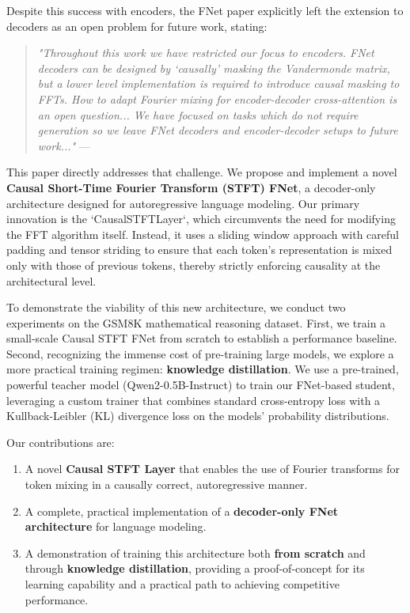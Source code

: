 \documentclass[11pt,a4paper]{article}
\begin{document}
Despite this success with encoders, the FNet paper explicitly left the extension to decoders as an open problem for future work, stating:

\begin{quote}
    \textit{"Throughout this work we have restricted our focus to encoders. FNet decoders can be designed by `causally' masking the Vandermonde matrix, but a lower level implementation is required to introduce causal masking to FFTs. How to adapt Fourier mixing for encoder-decoder cross-attention is an open question... We have focused on tasks which do not require generation so we leave FNet decoders and encoder-decoder setups to future work..."} --- \citet{lee2021fnet}
\end{quote}

This paper directly addresses that challenge. We propose and implement a novel \textbf{Causal Short-Time Fourier Transform (STFT) FNet}, a decoder-only architecture designed for autoregressive language modeling. Our primary innovation is the `CausalSTFTLayer`, which circumvents the need for modifying the FFT algorithm itself. Instead, it uses a sliding window approach with careful padding and tensor striding to ensure that each token's representation is mixed only with those of previous tokens, thereby strictly enforcing causality at the architectural level.

To demonstrate the viability of this new architecture, we conduct two experiments on the GSM8K mathematical reasoning dataset. First, we train a small-scale Causal STFT FNet from scratch to establish a performance baseline. Second, recognizing the immense cost of pre-training large models, we explore a more practical training regimen: \textbf{knowledge distillation}. We use a pre-trained, powerful teacher model (Qwen2-0.5B-Instruct) to train our FNet-based student, leveraging a custom trainer that combines standard cross-entropy loss with a Kullback-Leibler (KL) divergence loss on the models' probability distributions.

Our contributions are:
\begin{enumerate}
    \item A novel \textbf{Causal STFT Layer} that enables the use of Fourier transforms for token mixing in a causally correct, autoregressive manner.
    \item A complete, practical implementation of a \textbf{decoder-only FNet architecture} for language modeling.
    \item A demonstration of training this architecture both \textbf{from scratch} and through \textbf{knowledge distillation}, providing a proof-of-concept for its learning capability and a practical path to achieving competitive performance.
\end{enumerate}
\end{document}

